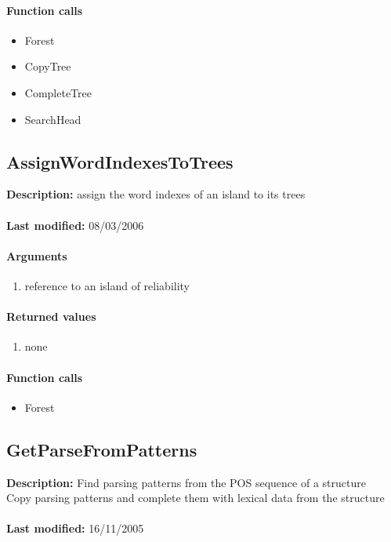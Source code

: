 \paragraph{Function calls}
\begin{itemize}
\item Forest
\item CopyTree
\item CompleteTree
\item SearchHead
\end{itemize}

\subsection{AssignWordIndexesToTrees}
\textbf{Description:} assign the word indexes of an island to its trees\\
\\\textbf{Last modified:} 08/03/2006

\paragraph{Arguments}
\begin{enumerate}
\item reference to an island of reliability
\end{enumerate}

\paragraph{Returned values}
\begin{enumerate}
\item none
\end{enumerate}

\paragraph{Function calls}
\begin{itemize}
\item Forest
\end{itemize}

\subsection{GetParseFromPatterns}
\textbf{Description:} Find parsing patterns from the POS sequence of a structure\\
Copy parsing patterns and complete them with lexical data from the structure\\
\\\textbf{Last modified:} 16/11/2005

